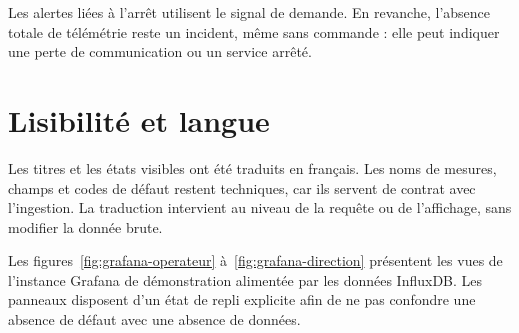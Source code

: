 Les alertes liées à l'arrêt utilisent le signal de demande. En revanche,
l'absence totale de télémétrie reste un incident, même sans commande : elle
peut indiquer une perte de communication ou un service arrêté.

\section{Lisibilité et langue}

Les titres et les états visibles ont été traduits en français. Les noms de
mesures, champs et codes de défaut restent techniques, car ils servent de
contrat avec l'ingestion. La traduction intervient au niveau de la requête ou
de l'affichage, sans modifier la donnée brute.

Les figures~\ref{fig:grafana-operateur} à~\ref{fig:grafana-direction}
présentent les vues de l'instance Grafana de démonstration alimentée par les
données InfluxDB. Les panneaux disposent d'un état de repli explicite afin de
ne pas confondre une absence de défaut avec une absence de données.
